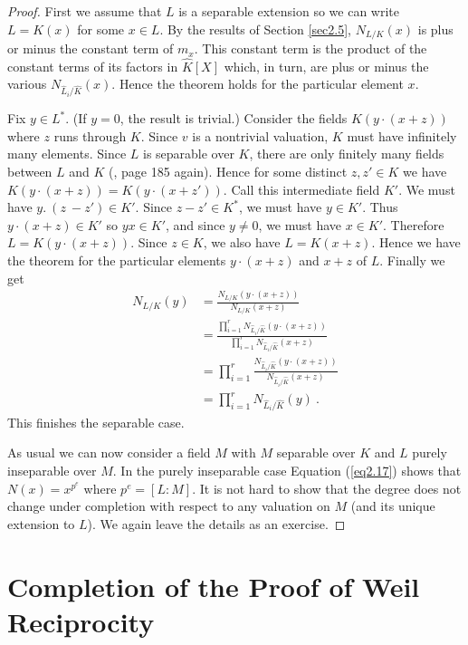 \begin{proof}
First we assume that $L$ is a separable extension so we can write $L=K(x)$ for some $x\in L$. By the results of Section \ref{sec2.5}, $N_{L/K}(x)$ is plus or minus the constant term of $m_{x}$. This constant term is the product of the constant terms of its factors in $\hat{K}[X]$ which, in turn, are plus or minus the various $N_{\hat{L}_{i}/\hat{K}}(x)$. Hence the theorem holds for the particular element $x$.

Fix $y\in L^{*}$. (If $y=0$, the result is trivial.) Consider the fields $K(y\cdot(x+z))$ where $z$ runs through $K$. Since $v$ is a nontrivial valuation, $K$ must have infinitely many elements. Since $L$ is separable over $K$, there are only finitely many fields between $L$ and $K$ (\cite{r1.2}, page 185 again). Hence for some distinct $z,z'\in K$ we have $K(y\cdot(x+z))=K(y\cdot(x+z'))$. Call this intermediate field $K'$. We must have $y.\ (z\ -z')\in K'$. Since $z -z'\in K^{*}$, we must have $y\in K'$. Thus $y\cdot(x+z) \in K'$ so $yx\in K'$, and since $y\neq 0$, we must have $x\in K'$. Therefore $L=K(y\cdot(x+z))$. Since $z \in K$, we also have $L=K(x+z)$. Hence we have the theorem for the particular elements $y\cdot(x+z)$ and $x+z$ of $L$. Finally we get
\begin{align*}
N_{L/K}(y)&=\frac{N_{L/K}(y\cdot(x+z))}{N_{L/K}(x+z)}\\
&=\frac{\prod_{i=1}^{r}N_{\hat{L}_{i}/\hat{K}}(y\cdot(x+z))}{\prod_{i=1}^{r}N_{\hat{L}_{i}/\hat{K}}(x+z)}\\
&=\prod_{i=1}^{r}\frac{N_{\hat{L}_{i}/\hat{K}}(y\cdot(x+z))}{N_{\hat{L}_{i}/\hat{K}}(x+z)}\\
&=\prod_{i=1}^{r}N_{\hat{L}_{i}/\hat{K}}(y)\ .
\end{align*}
This finishes the separable case.

As usual we can now consider a field $M$ with $M$ separable over $K$ and $L$ purely inseparable over $M$. In the purely inseparable case Equation (\ref{eq2.17}) shows that $N(x)=x^{p^e}$ where $p^{e}=[L:M]$. It is not hard to show that the degree does not change under completion with respect to any valuation on $M$ (and its unique extension to $L$). We again leave the details as an exercise.
\end{proof}

\section{Completion of the Proof of Weil Reciprocity}

